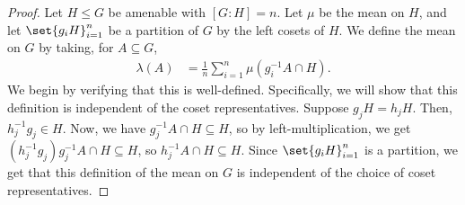 \begin{proof}
  Let $H\leq G$ be amenable with $\left[G:H\right] = n$. Let $\mu$ be the mean on $H$, and let $\set{g_iH}_{i=1}^{n}$ be a partition of $G$ by the left cosets of $H$. We define the mean on $G$ by taking, for $A\subseteq G$,
  \begin{align*}
    \lambda\left(A\right) &= \frac{1}{n}\sum_{i=1}^{n}\mu\left(g_i^{-1}A\cap H\right).
  \end{align*}
  We begin by verifying that this is well-defined. Specifically, we will show that this definition is independent of the coset representatives. Suppose $g_jH = h_j H$. Then, $h_j^{-1}g_j \in H$. Now, we have $g_j^{-1}A \cap H \subseteq H$, so by left-multiplication, we get $\left(h_j^{-1}g_j\right)g_j^{-1}A\cap H \subseteq H$, so $h_j^{-1}A\cap H\subseteq H$. Since $\set{g_i H}_{i=1}^{n}$ is a partition, we get that this definition of the mean on $G$ is independent of the choice of coset representatives.\newline


\end{proof}

